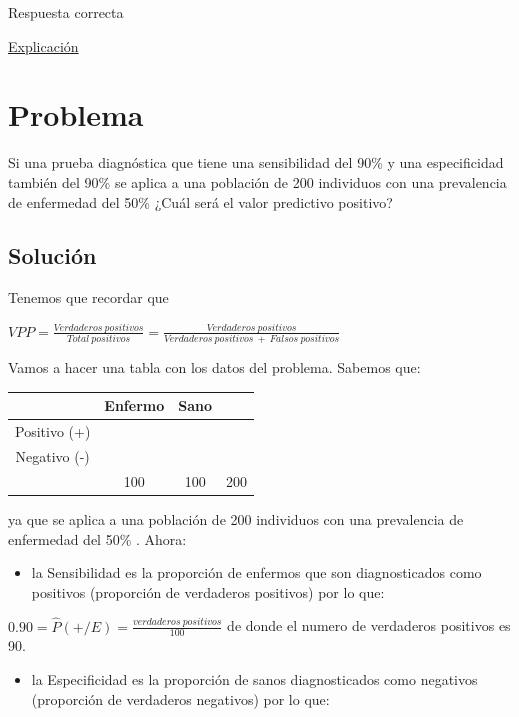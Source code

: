 \documentclass[
]{book}
\providecommand{\tightlist}{%
  \setlength{\itemsep}{0pt}\setlength{\parskip}{0pt}}
\begin{document}
Respuesta correcta

\href{https://1fjmanzano.github.io/bioestadistica/relaci\%C3\%B3n-entre-variables-cualitativas.html\#diagno\%CC\%81stico-cli\%CC\%81nico}{Explicación}

\hypertarget{problema-11}{%
\section{Problema}\label{problema-11}}

Si una prueba diagnóstica que tiene una sensibilidad del 90\% y una especificidad también del 90\% se aplica a una población de 200 individuos con una prevalencia de enfermedad del 50\% ¿Cuál será el valor predictivo positivo?

\hypertarget{soluciuxf3n-9}{%
\subsection{Solución}\label{soluciuxf3n-9}}

Tenemos que recordar que

\(VPP=\frac{Verdaderos ~ positivos}{Total ~ positivos}=\frac{Verdaderos ~ positivos}{Verdaderos ~ positivos ~ + ~ Falsos ~ positivos}\)

Vamos a hacer una tabla con los datos del problema. Sabemos que:

\begin{longtable}[]{@{}cccc@{}}
\toprule
& Enfermo & Sano &\tabularnewline
\midrule
\endhead
Positivo (+) & & &\tabularnewline
Negativo (-) & & &\tabularnewline
& 100 & 100 & 200\tabularnewline
\bottomrule
\end{longtable}

ya que se aplica a una población de 200 individuos con una prevalencia de enfermedad del 50\% . Ahora:

\begin{itemize}
\tightlist
\item
  la Sensibilidad es la proporción de enfermos que son diagnosticados como positivos (proporción de verdaderos positivos) por lo que:
\end{itemize}

\(0.90 = \hat{P}(+/E) = \frac{verdaderos ~ positivos}{100}\) de donde el numero de verdaderos positivos es 90.

\begin{itemize}
\tightlist
\item
  la Especificidad es la proporción de sanos diagnosticados como negativos (proporción de verdaderos negativos) por lo que:
\end{itemize}
\end{document}
